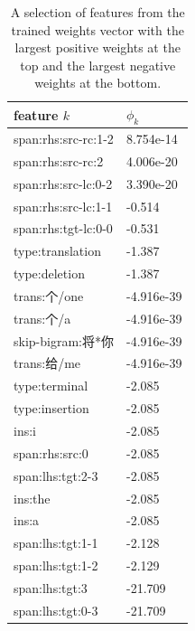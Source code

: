\documentclass[11pt,a4paper]{article}
\begin{document}
\begin{table}

\begin{center}
\begin{CJK}{UTF8}{gbsn}
\small{
\begin{tabular}{ |l|l| } 
\hline
feature $k$ & $\phi_k$ \\ 
\hline
span:rhs:src-rc:1-2 &   8.754e-14 \\
span:rhs:src-rc:2   &   4.006e-20 \\
span:rhs:src-lc:0-2 &   3.390e-20 \\
span:rhs:src-lc:1-1 &   -0.514 \\
span:rhs:tgt-lc:0-0 &   -0.531 \\
type:translation    &   -1.387 \\
type:deletion       &   -1.387 \\
trans:个/one        &   -4.916e-39 \\
trans:个/a          &   -4.916e-39 \\
skip-bigram:将*你   &   -4.916e-39 \\
trans:给/me         &   -4.916e-39 \\
type:terminal       &   -2.085 \\
type:insertion      &   -2.085 \\
ins:i               &   -2.085 \\
span:rhs:src:0      &   -2.085 \\
span:lhs:tgt:2-3    &   -2.085 \\
ins:the             &   -2.085 \\
ins:a               &   -2.085 \\
span:lhs:tgt:1-1    &   -2.128 \\
span:lhs:tgt:1-2    &   -2.129 \\
span:lhs:tgt:3      &   -21.709 \\
span:lhs:tgt:0-3    &   -21.709 \\
\hline
\end{tabular}
}
\end{CJK}
\end{center}
\caption{A selection of features from the trained weights vector with the largest positive weights at the top and the largest negative weights at the bottom.}
\label{table:features}
\end{table}




\end{document}
